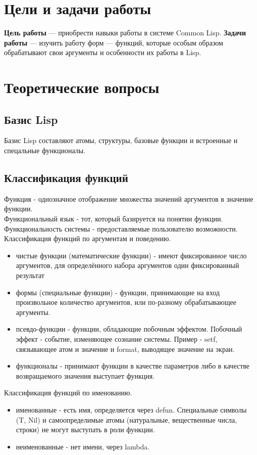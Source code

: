 \chapter{Цели и задачи работы}
\textbf{Цель работы} --- приобрести навыки работы в системе Common Lisp.
\textbf{Задачи работы} --- изучить работу форм — функций, которые особым образом обрабатывают
свои аргументы и особенности их работы в Lisp.

\chapter{Теоретические вопросы}
\section{Базис Lisp}
Базис Lisp составляют атомы, структуры, базовые функции и встроенные и спецальные функционалы.
\section{Классификация функций}
Функция - однозначное отображение множества значений аргументов в значение функции.\\
Функциональный язык - тот, который базируется на понятии функции.\\
Функциональность системы - предоставляемые пользователю возможности.\\

Классификация функций по аргументам и поведению.
\begin{itemize}
\item чистые функции (математические функции) - имеют фиксированное число аргументов, для определённого набора аргументов один фиксированный результат
\item формы (специальные функции) - функции, принимающие на вход произвольное количество аргументов, или по-разному обрабатывающее аргументы.
\item псевдо-функции - функции, обладающие побочным эффектом. Побочный эффект - событие, изменяющее сознание системы. Пример - setf, связывающее атом и значение и format, выводящее значение на экран.\item функционалы - принимают функции в качестве параметров либо в качестве возвращаемого значения выступает функция.
\end{itemize}

Классификация функций по именованию.
\begin{itemize}
\item именованные - есть имя, определяется через defun. Специальные символы (T, Nil) и самоопределимые атомы (натуральные, вещественные числа, строки) не могут выступать в роли функции.
\item неименованные - нет имени, через lambda.
\end{itemize}

